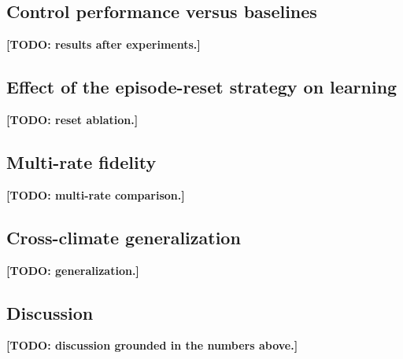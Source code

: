 \documentclass[preprint,review,12pt]{elsarticle}
\begin{document}
\subsection{Control performance versus baselines}
\textbf{[TODO: results after experiments.]}

\subsection{Effect of the episode-reset strategy on learning}
\textbf{[TODO: reset ablation.]}

\subsection{Multi-rate fidelity}
\textbf{[TODO: multi-rate comparison.]}

\subsection{Cross-climate generalization}
\textbf{[TODO: generalization.]}

\subsection{Discussion}
\textbf{[TODO: discussion grounded in the numbers above.]}

\end{document}
